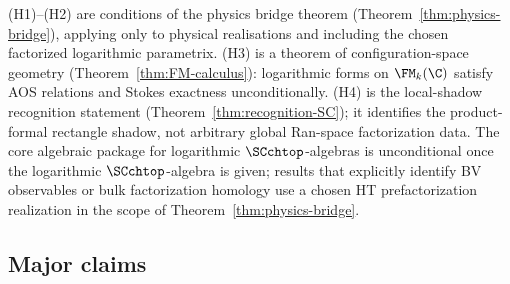 (H1)--(H2) are conditions of the physics bridge theorem (Theorem~\ref{thm:physics-bridge}), applying only to physical realisations and including the chosen factorized logarithmic parametrix. (H3) is a theorem of configuration-space geometry (Theorem~\ref{thm:FM-calculus}): logarithmic forms on $\FM_k(\C)$ satisfy AOS relations and Stokes exactness unconditionally. (H4) is the local-shadow recognition statement (Theorem~\ref{thm:recognition-SC}); it identifies the product-formal rectangle shadow, not arbitrary global Ran-space factorization data. The core algebraic package for logarithmic $\SCchtop$-algebras is unconditional once the logarithmic $\SCchtop$-algebra is given; results that explicitly identify BV observables or bulk factorization homology use a chosen HT prefactorization realization in the scope of Theorem~\ref{thm:physics-bridge}.

\subsection{Major claims}

